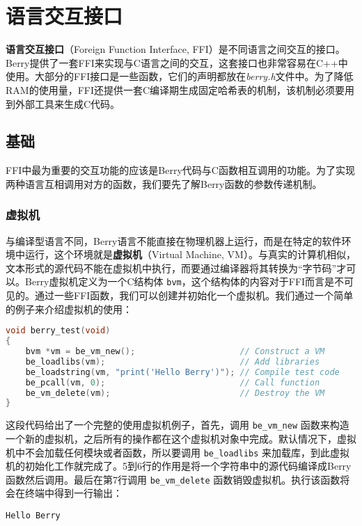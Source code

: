 \chapter{语言交互接口}

\textbf{语言交互接口}（Foreign Function Interface, FFI）是不同语言之间交互的接口。Berry提供了一套FFI来实现与C语言之间的交互，这套接口也非常容易在C++中使用。大部分的FFI接口是一些函数，它们的声明都放在\textit{berry.h}文件中。为了降低RAM的使用量，FFI还提供一套C编译期生成固定哈希表的机制，该机制必须要用到外部工具来生成C代码。

\section{基础}

FFI中最为重要的交互功能的应该是Berry代码与C函数相互调用的功能。为了实现两种语言互相调用对方的函数，我们要先了解Berry函数的参数传递机制。

\subsection{虚拟机}

与编译型语言不同，Berry语言不能直接在物理机器上运行，而是在特定的软件环境中运行，这个环境就是\textbf{虚拟机}（Virtual Machine, VM）。与真实的计算机相似，文本形式的源代码不能在虚拟机中执行，而要通过编译器将其转换为``字节码''才可以。Berry虚拟机定义为一个C结构体 \texttt{bvm}，这个结构体的内容对于FFI而言是不可见的。通过一些FFI函数，我们可以创建并初始化一个虚拟机。我们通过一个简单的例子来介绍虚拟机的使用：
\begin{lstlisting}[language=c, style=berry]
void berry_test(void)
{
    bvm *vm = be_vm_new();                     // Construct a VM
    be_loadlibs(vm);                           // Add libraries
    be_loadstring(vm, "print('Hello Berry')"); // Compile test code
    be_pcall(vm, 0);                           // Call function
    be_vm_delete(vm);                          // Destroy the VM
}
\end{lstlisting}
这段代码给出了一个完整的使用虚拟机例子，首先，调用 \texttt{be\_vm\_new} 函数来构造一个新的虚拟机，之后所有的操作都在这个虚拟机对象中完成。默认情况下，虚拟机中不会加载任何模块或者函数，所以要调用 \texttt{be\_loadlibs} 来加载库，到此虚拟机的初始化工作就完成了。5到6行的作用是将一个字符串中的源代码编译成Berry函数然后调用。最后在第7行调用 \texttt{be\_vm\_delete} 函数销毁虚拟机。执行该函数将会在终端中得到一行输出：
\begin{lstlisting}[numbers=none]
Hello Berry
\end{lstlisting}

